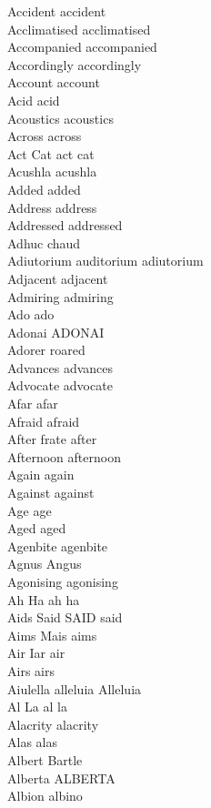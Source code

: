 Accident accident\\
Acclimatised acclimatised\\
Accompanied accompanied\\
Accordingly accordingly\\
Account account\\
Acid acid\\
Acoustics acoustics\\
Across across\\
Act Cat act cat\\
Acushla acushla\\
Added added\\
Address address\\
Addressed addressed\\
Adhuc chaud\\
Adiutorium auditorium adiutorium\\
Adjacent adjacent\\
Admiring admiring\\
Ado ado\\
Adonai ADONAI\\
Adorer roared\\
Advances advances\\
Advocate advocate\\
Afar afar\\
Afraid afraid\\
After frate after\\
Afternoon afternoon\\
Again again\\
Against against\\
Age age\\
Aged aged\\
Agenbite agenbite\\
Agnus Angus\\
Agonising agonising\\
Ah Ha ah ha\\
Aids Said SAID said\\
Aims Mais aims\\
Air Iar air\\
Airs airs\\
Aiulella alleluia Alleluia\\
Al La al la\\
Alacrity alacrity\\
Alas alas\\
Albert Bartle\\
Alberta ALBERTA\\
Albion albino\\
